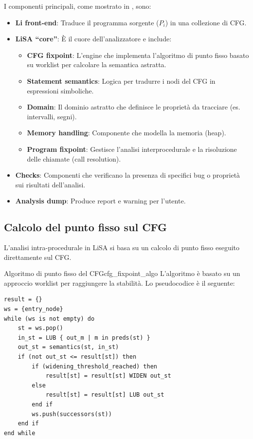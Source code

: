 I componenti principali, come mostrato in , sono:
\begin{itemize}
    \item \textbf{Li front-end}: Traduce il programma sorgente ($P_i$) in una
    collezione di CFG.
    \item \textbf{LiSA ``core''}: È il cuore dell'analizzatore e include:
    \begin{itemize}
        \item \textbf{CFG fixpoint}: L'engine che implementa l'algoritmo di
        punto fisso basato su worklist per calcolare la semantica astratta.
        \item \textbf{Statement semantics}: Logica per tradurre i nodi del
        CFG in espressioni simboliche.
        \item \textbf{Domain}: Il dominio astratto che definisce le
        proprietà da tracciare (es. intervalli, segni).
        \item \textbf{Memory handling}: Componente che modella la
        memoria (heap).
        \item \textbf{Program fixpoint}: Gestisce l'analisi interprocedurale
        e la risoluzione delle chiamate (call resolution).
    \end{itemize}
    \item \textbf{Checks}: Componenti che verificano la presenza di specifici
    bug o proprietà sui risultati dell'analisi.
    \item \textbf{Analysis dump}: Produce report e warning per l'utente.
\end{itemize}

\subsection{Calcolo del punto fisso sul CFG}

L'analisi intra-procedurale in LiSA si basa su un calcolo di punto
fisso eseguito direttamente sul CFG.

\begin{definizione}{Algoritmo di punto fisso del CFG}{cfg_fixpoint_algo}
L'algoritmo è basato su un approccio worklist per raggiungere la stabilità.
Lo pseudocodice è il seguente:
\begin{verbatim}
result = {}
ws = {entry_node}
while (ws is not empty) do
    st = ws.pop()
    in_st = LUB { out_m | m in preds(st) }
    out_st = semantics(st, in_st)
    if (not out_st <= result[st]) then
        if (widening_threshold_reached) then
            result[st] = result[st] WIDEN out_st
        else
            result[st] = result[st] LUB out_st
        end if
        ws.push(successors(st))
    end if
end while
\end{verbatim}
\end{definizione}

